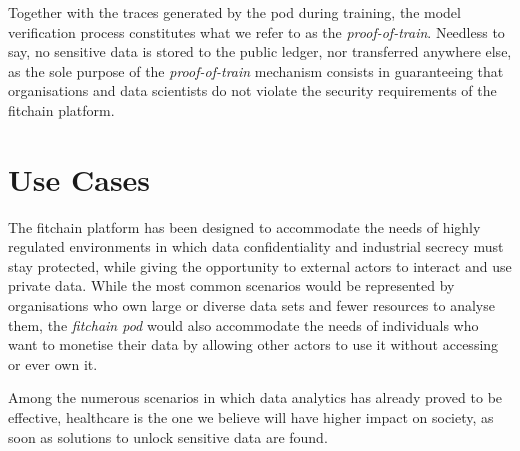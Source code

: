 \documentclass[12pt, a4paper,titlepage]{extreport}
\begin{document}
Together with the traces generated by the pod during training, the model verification process constitutes what we refer to as the \textit{proof-of-train}. 
Needless to say, no sensitive data is stored to the public ledger, nor transferred anywhere else, as the sole purpose of the \textit{proof-of-train} mechanism consists in guaranteeing that organisations and data scientists do not violate the security requirements of the fitchain platform.


\section{Use Cases}
The fitchain platform has been designed to accommodate the needs of highly regulated environments in which data confidentiality and industrial secrecy must stay protected, while giving the opportunity to external actors to interact and use private data. While the most common scenarios would be represented by organisations who own large or diverse data sets and fewer resources to analyse them, the \textit{fitchain pod} would also accommodate the needs of individuals who want to  monetise their data by allowing other actors to use it without accessing or ever own it. 

Among the numerous scenarios in which data analytics has already proved to be effective, healthcare is the one we believe will have higher impact on society, as soon as solutions to unlock sensitive data are found. 




\end{document}
